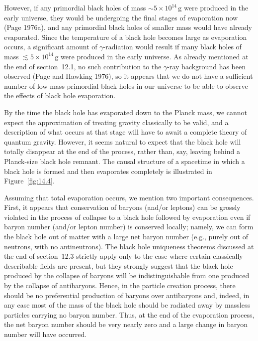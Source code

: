 

However, if any primordial black holes of mass \(\sim5\times10^{14}\,\mathrm g\)
were produced in the early universe, they would be undergoing the final stages of
evaporation now (Page 1976a), and any primordial black holes of smaller mass would
have already evaporated. Since the temperature of a black hole becomes large as
evaporation occurs, a significant amount of \(\gamma\)-radiation would result if many
black holes of mass \(\lesssim5\times10^{14}\,\mathrm g\) were produced in the
early universe. As already mentioned at the end of section~12.1, no such contribution
to the \(\gamma\)-ray background has been observed (Page and Hawking 1976), so it
appears that we do not have a sufficient number of low mass primordial black holes
in our universe to be able to observe the effects of black hole evaporation.

By the time the black hole has evaporated down to the Planck mass, we cannot
expect the approximation of treating gravity classically to be valid, and a description
of what occurs at that stage will have to await a complete theory of quantum gravity.
However, it seems natural to expect that the black hole will totally disappear at the
end of the process, rather than, say, leaving behind a Planck-size black hole remnant.
The causal structure of a spacetime in which a black hole is formed and then
evaporates completely is illustrated in Figure~\ref{fig:14.4}.

Assuming that total evaporation occurs, we mention two important consequences.
First, it appears that conservation of baryons (and/or leptons) can be grossly violated
in the process of collapse to a black hole followed by evaporation even if baryon
number (and/or lepton number) is conserved locally; namely, we can form the black
hole out of matter with a large net baryon number (e.g., purely out of neutrons, with
no antineutrons). The black hole uniqueness theorems discussed at the end of
section~12.3 strictly apply only to the case where certain classically describable
fields are present, but they strongly suggest that the black hole produced by the
collapse of baryons will be indistinguishable from one produced by the collapse of
antibaryons. Hence, in the particle creation process, there should be no preferential
production of baryons over antibaryons and, indeed, in any case most of the mass of
the black hole should be radiated away by massless particles carrying no baryon
number. Thus, at the end of the evaporation process, the net baryon number should
be very nearly zero and a large change in baryon number will have occurred.

